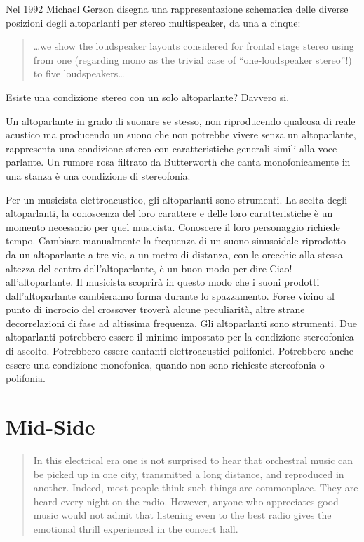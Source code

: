 Nel 1992 Michael Gerzon \cite{mg92pdmsss} disegna una rappresentazione
schematica delle diverse posizioni degli altoparlanti per stereo multispeaker,
da una a cinque:

\begin{quotation}
\ldots we show the loudspeaker layouts considered for frontal stage stereo
using from one (regarding mono as the trivial case of “one-loudspeaker stereo”!)
to five loudspeakers…
\end{quotation}

Esiste una condizione stereo con un solo altoparlante? Davvero si.

Un altoparlante in grado di suonare se stesso, non riproducendo qualcosa di
reale acustico ma producendo un suono che non potrebbe vivere senza un
altoparlante, rappresenta una condizione stereo con caratteristiche generali
simili alla voce parlante. Un rumore rosa filtrato da Butterworth che canta
monofonicamente in una stanza è una condizione di stereofonia.

Per un musicista elettroacustico, gli altoparlanti sono strumenti. La scelta
degli altoparlanti, la conoscenza del loro carattere e delle loro
caratteristiche è un momento necessario per quel musicista. Conoscere il loro
personaggio richiede tempo. Cambiare manualmente la frequenza di un suono
sinusoidale riprodotto da un altoparlante a tre vie, a un metro di distanza,
con le orecchie alla stessa altezza del centro dell'altoparlante, è un buon modo
per dire Ciao! all'altoparlante. Il musicista scoprirà in questo modo che i
suoni prodotti dall'altoparlante cambieranno forma durante lo spazzamento. Forse
vicino al punto di incrocio del crossover troverà alcune peculiarità, altre
strane decorrelazioni di fase ad altissima frequenza. Gli altoparlanti sono
strumenti. Due altoparlanti potrebbero essere il minimo impostato per la
condizione stereofonica di ascolto. Potrebbero essere cantanti elettroacustici
polifonici. Potrebbero anche essere una condizione monofonica, quando non sono
richieste stereofonia o polifonia.%

\section{Mid-Side}
%
\begin{quotation}
In this electrical era one is not surprised to hear that orchestral music can be
picked up in one city, transmitted a long distance, and reproduced in another.
Indeed, most people think such things are commonplace. They are heard every
night on the radio. However, anyone who appreciates good music would not admit
that listening even to the best radio gives the emotional thrill experienced in
the concert hall. \cite{hf34}
\end{quotation}

